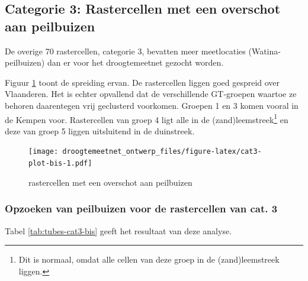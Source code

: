 \documentclass[11pt,]{book}
\let\rmarkdownfootnote\footnote%
\def\footnote{\protect\rmarkdownfootnote}
\begin{document}
\subsection{Categorie 3: Rastercellen met een overschot aan
peilbuizen}\label{cat3}

De overige 70 rastercellen, categorie 3, bevatten meer meetlocaties
(Watina-peilbuizen) dan er voor het droogtemeetnet gezocht worden.

Figuur \ref{fig:cat3-plot-bis} toont de spreiding ervan. De rastercellen
liggen goed gespreid over Vlaanderen. Het is echter opvallend dat de
verschillende GT-groepen waartoe ze behoren daarentegen vrij geclusterd
voorkomen. Groepen 1 en 3 komen vooral in de Kempen voor. Rastercellen
van groep 4 ligt alle in de (zand)leemstreek\footnote{Dit is normaal,
  omdat alle cellen van deze groep in de (zand)leemstreek liggen.} en
deze van groep 5 liggen uitsluitend in de duinstreek.

\begin{figure}
\centering
\texttt{[image: droogtemeetnet\_ontwerp\_files/figure-latex/cat3-plot-bis-1.pdf]}
\caption{\label{fig:cat3-plot-bis}rastercellen met een overschot aan
peilbuizen}
\end{figure}

\subsubsection{Opzoeken van peilbuizen voor de rastercellen van cat.
3}\label{opzoeken-van-peilbuizen-voor-de-rastercellen-van-cat.-3}

Tabel \ref{tab:tubes-cat3-bis} geeft het resultaat van deze analyse.
\end{document}
